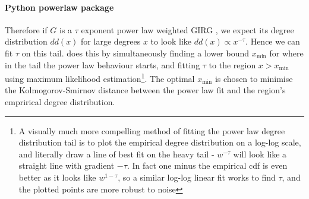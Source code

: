 




\paragraph{Python powerlaw package}
Therefore if $G$ is a $\tau$ exponent power law weighted GIRG , we expect its degree distribution $dd(x)$ for large degrees $x$ to look like $dd(x) \propto x^{-\tau}$. Hence we can fit $\tau$ on this tail. \PLP does this by simultaneously finding a lower bound $x_{\min}$ for where in the tail the power law behaviour starts, and fitting $\tau$ to the region $x > x_{\min}$ using maximum likelihood estimation\footnote{A visually much more compelling method of fitting the power law degree distribution tail is to plot the empirical degree distribution on a log-log scale, and literally draw a line of best fit on the heavy tail - $w^{-\tau}$ will look like a straight line with gradient $-\tau$. In fact one minus the empirical cdf is even better as it looks like $w^{1-\tau}$, so a similar log-log linear fit works to find $\tau$, and the plotted points are more robust to noise}. The optimal $x_{\min}$ is chosen to minimise the Kolmogorov-Smirnov distance between the power law fit and the region's emprirical degree distribution.

